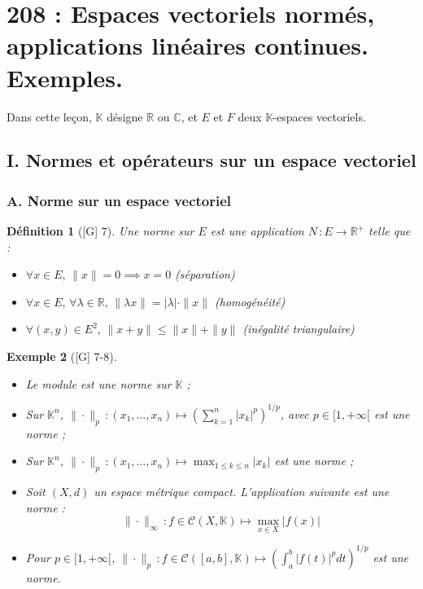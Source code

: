 \documentclass[10pt, a4paper, parskip=full, twoside, twocolumn]{report}
\newtheorem{definition}{Définition}
\newtheorem{example}[definition]{Exemple}
\newcommand{\IK}{\mathbb{K}}
\newcommand{\IC}{\mathbb{C}}
\newcommand{\IR}{\mathbb{R}}
\begin{document}
\chapter*{208 : Espaces vectoriels normés, applications linéaires continues. Exemples.}
\setcounter{definition}{0}

\textcolor{paragraphtext}{Dans cette leçon, $\IK$ désigne $\IR$ ou $\IC$, et $E$ et $F$ deux $\IK$-espaces vectoriels.}
\section*{I. Normes et opérateurs sur un espace vectoriel}
\subsection*{A. Norme sur un espace vectoriel}

\begin{definition}[\textnormal{[G] 7}]
	Une \emph{norme sur $E$} est une application $N\,\colon E\to\IR^+$ telle que :
	\begin{itemize}
		\item $\forall x\in E,\, \|x\|=0\implies x=0$ (séparation)
		\item $\forall x\in E,\,\forall\lambda\in\IR,\,\|\lambda x\|=\vert\lambda\vert\cdot\|x\|$ (homogénéité)
		\item $\forall (x,y)\in E^2,\, \|x+y\|\leq \|x\|+\|y\|$ (inégalité triangulaire)
	\end{itemize}
\end{definition}

\begin{example}[\textnormal{[G] 7-8}]
	\begin{itemize}
		\item Le module est une norme sur $\IK$ ;
		\item Sur $\IK^n$, $\|\cdot\|_p\,\colon (x_1,\dots, x_n)\mapsto \left(\sum_{k=1}^{n} \vert x_k\vert^p\right)^{1/p}$, avec $p\in [1,+\infty[$ est une norme ;
		\item Sur $\IK^n$, $\|\cdot\|_p\,\colon (x_1,\dots, x_n)\mapsto \max_{1\leq k\leq n} \vert x_k\vert$ est une norme ;
		\item Soit $(X,d)$ un espace métrique compact. L'application suivante est une norme : $$\|\cdot\|_{\infty}\,\colon f\in\mathcal{C}(X,\IK)\mapsto \max_{x\in X}\vert f(x)\vert$$
		\item Pour $p\in [1,+\infty[$, $\|\cdot\|_p\,\colon f\in\mathcal{C}([a,b],\IK)\mapsto \left(\int_{a}^{b}\vert f(t)\vert^p dt\right)^{1/p}$ est une norme.
	\end{itemize}
\end{example}
\end{document}
